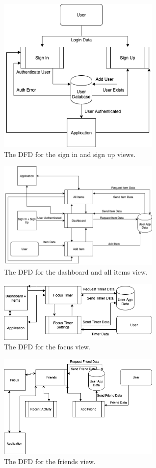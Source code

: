 \begin{figure}[H]

	\centering
	\includegraphics[width=8cm]{./graphics/design/DFD/Sign In + Sign Up DFD.png}
	\caption{The DFD for the sign in and sign up views.}
	\label{fig:signin_signup_dfd}
	
\end{figure}

\begin{figure}[H]

	\centering
	\includegraphics[width=8cm]{./graphics/design/DFD/Dashboard + Items DFD.png}
	\caption{The DFD for the dashboard and all items view.}
	\label{fig:dashboard_allitems_dfd}
	
\end{figure}

\begin{figure}[H]

	\centering
	\includegraphics[width=8cm]{./graphics/design/DFD/Focus DFD.png}
	\caption{The DFD for the focus view.}
	\label{fig:focus_dfd}
	
\end{figure}

\begin{figure}[H]

	\centering
	\includegraphics[width=8cm]{./graphics/design/DFD/Friends DFD.png}
	\caption{The DFD for the friends view.}
	\label{fig:friends_dfd}
	
\end{figure}